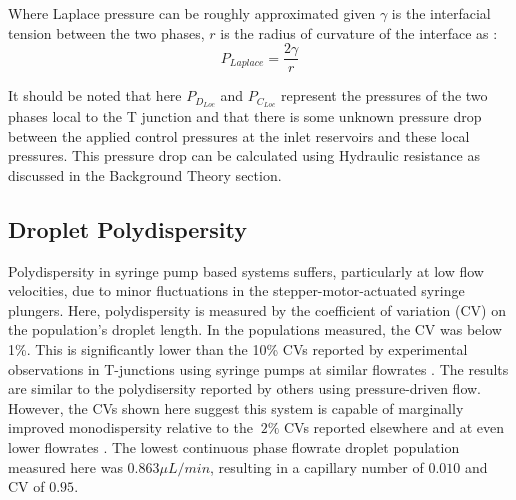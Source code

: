 Where Laplace pressure can be roughly approximated given $\gamma$ is the interfacial tension between the two phases, $r$ is the radius of curvature of the interface as \cite{Bruus2008}:
\begin{equation}
 P_{Laplace} = \frac{2 \gamma}{r}
\label{eq:laplace}
\end{equation}

It should be noted that here $P_{D_{Loc}}$ and $P_{C_{Loc}}$ represent the pressures of the two phases local to the T junction and that there is some unknown pressure drop between the applied control pressures at the inlet reservoirs and these local pressures. This pressure drop can be calculated using Hydraulic resistance as discussed in the Background Theory section.
 

\subsection{Droplet Polydispersity}

Polydispersity in syringe pump based systems suffers, particularly at low flow velocities, due to minor fluctuations in the stepper-motor-actuated syringe plungers\cite{Christopher2008}. Here, polydispersity is measured by the coefficient of variation (CV) on the population’s droplet length. In the populations measured, the CV was below 1\%. This is significantly lower than the 10\% CVs reported by experimental observations in T-junctions using syringe pumps at similar flowrates \cite{Christopher2008}. The results are similar to the polydisersity reported by others using pressure-driven flow. However, the CVs shown here suggest this system is capable of marginally improved monodispersity relative to the $~2\%$ CVs reported elsewhere and at even lower flowrates \cite{Lim2015, Kaminski2016}. The lowest continuous phase flowrate droplet population measured here was $0.863 \mu L / min$, resulting in a capillary number of $0.010$ and CV of $0.95$.

